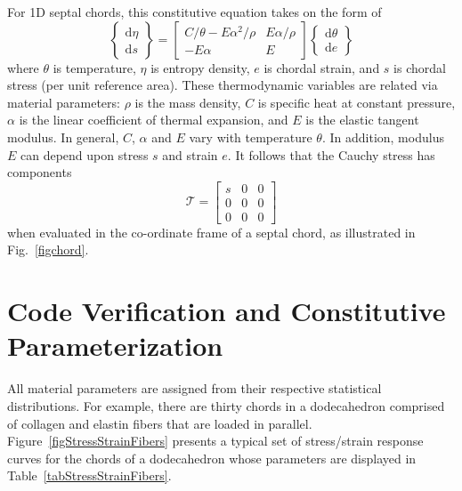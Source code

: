 For 1D septal chords, this constitutive equation takes on the form of 
\begin{equation}
    \left\{ \begin{matrix}
    \mathrm{d} \eta \\ \mathrm{d} s
    \end{matrix} \right\} = \begin{bmatrix}
    C / \theta - E \alpha^2 / \rho & E \alpha / \rho \\
    -E \alpha & E
    \end{bmatrix} \left\{ \begin{matrix}
    \mathrm{d} \theta \\ \mathrm{d} e
    \end{matrix} \right\}
\end{equation}
where $\theta$ is temperature, $\eta$ is entropy density, $e$ is chordal strain, and $s$ is chordal stress (per unit reference area).  These thermo\-dynamic variables are related via material parameters: $\rho$ is the mass density, $C$ is specific heat at constant pressure, $\alpha$ is the linear coefficient of thermal expansion, and $E$ is the elastic tangent modulus.  In general, $C$, $\alpha$ and $E$ vary with temperature $\theta$.  In addition, modulus $E$ can depend upon stress $s$ and strain $e$.  It follows that the Cauchy stress has components
\begin{equation}
    \boldsymbol{\mathcal{T}} = \begin{bmatrix}
    s & 0 & 0 \\
    0 & 0 & 0 \\
    0 & 0 & 0
    \end{bmatrix}
\end{equation}
when evaluated in the co-ordinate frame of a septal chord, as illustrated in Fig.~\ref{figchord}.

\section{Code Verification and Constitutive Parameterization}
\label{secCE_verifyCode}

All material parameters are assigned from their respective statistical distributions.  For example, there are thirty chords in a dodecahedron comprised of collagen and elastin fibers that are loaded in parallel.  Figure~\ref{figStressStrainFibers} presents a typical set of stress\slash strain response curves for the chords of a dodecahedron whose parameters are displayed in Table~\ref{tabStressStrainFibers}.

